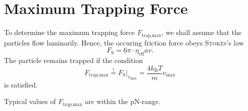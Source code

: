 \section{Maximum Trapping Force}
To determine the maximum trapping force $F_\text{trap,max}$, we shall assume that the particles flow laminarily.
Hence, the occuring friction force obeys \textsc{Stokes}'s law
\begin{equation*}
	F_\text{S} = 6\pi\cdot\eta_\text{eff}av.
\end{equation*}
The particle remains trapped if the condition
\begin{equation*}
	F_\text{trap,max} \stackrel{!}{=} F_\text{S}\rvert_{v_\text{max}} = \frac{4k_\text{B}T}{m}v_\text{max}
\end{equation*}
is satisfied.

Typical values of $F_\text{trap,max}$ are within the \si{\pico\newton}-range.
